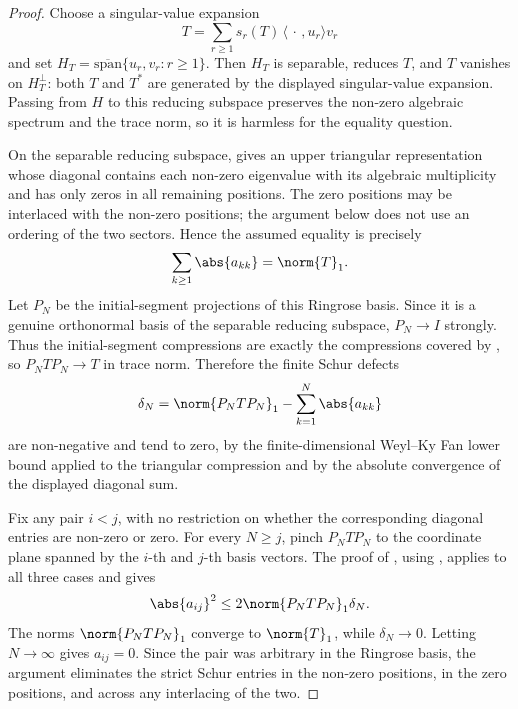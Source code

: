 \begin{proof}
  Choose a singular-value expansion
  \[
    T=\sum_{r\ge1}s_r(T)\,\langle\,\cdot\,,u_r\rangle v_r
  \]
  and set \(H_T=\overline{\mathrm{span}}\{u_r,v_r:r\ge1\}\). Then \(H_T\) is
  separable, reduces \(T\), and \(T\) vanishes on \(H_T^\perp\): both \(T\) and
  \(T^*\) are generated by the displayed singular-value expansion. Passing from
  \(H\) to this reducing subspace preserves the non-zero algebraic spectrum and
  the trace norm, so it is harmless for the equality question.

  On the separable reducing subspace, 
  gives an upper triangular representation whose diagonal contains each
  non-zero eigenvalue with its algebraic multiplicity and has only zeros in all
  remaining positions.  The zero positions may be interlaced with the non-zero
  positions; the argument below does not use an ordering of the two sectors.
  Hence the assumed equality is precisely
  \[
    \sum_{k\ge1}\abs{a_{kk}}=\norm{T}_1 .
  \]
  Let \(P_N\) be the initial-segment projections of this Ringrose
  basis. Since it is a genuine orthonormal basis of the separable reducing
  subspace, \(P_N\to I\) strongly.  Thus the initial-segment compressions are
  exactly the compressions covered by
  , so \(P_NTP_N\to T\) in trace norm.
  Therefore the finite Schur defects
  \[
    \delta_N=\norm{P_NTP_N}_1-
      \sum_{k=1}^N\abs{a_{kk}}
  \]
  are non-negative and tend to zero, by the finite-dimensional Weyl--Ky Fan
  lower bound applied to the triangular compression and by the absolute
  convergence of the displayed diagonal sum.

  Fix any pair \(i<j\), with no restriction on whether the corresponding
  diagonal entries are non-zero or zero. For every \(N\ge j\), pinch
  \(P_NTP_N\) to the coordinate plane spanned by the \(i\)-th and \(j\)-th basis
  vectors. The proof of , using
  , applies to all three cases and gives
  \[
    \abs{a_{ij}}^2\le 2\norm{P_NTP_N}_1\delta_N .
  \]
  The norms \(\norm{P_NTP_N}_1\) converge to \(\norm{T}_1\), while
  \(\delta_N\to0\). Letting \(N\to\infty\) gives \(a_{ij}=0\). Since the pair was
  arbitrary in the Ringrose basis, the argument eliminates the strict Schur
  entries in the non-zero positions, in the zero positions, and across any
  interlacing of the two.
\end{proof}

